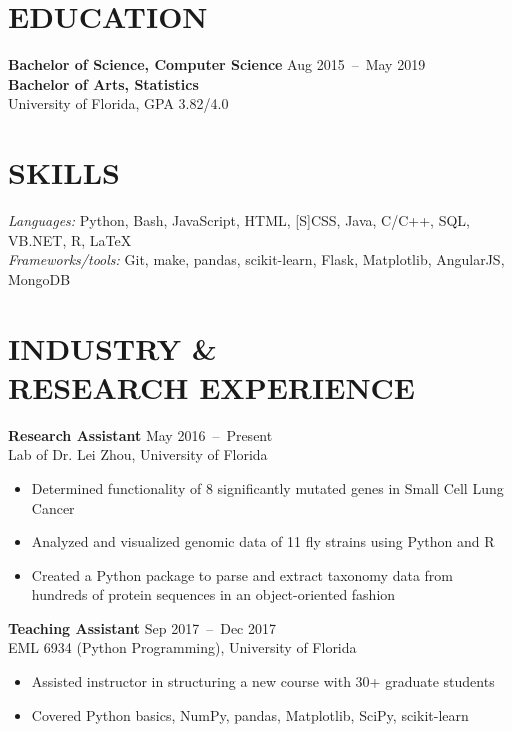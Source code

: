\documentclass[line,resmargin]{res}
\begin{document}
\address{}
\address{}

\begin{resume}

\section{EDUCATION}
    \textbf{Bachelor of Science, Computer Science}    \hfill Aug 2015~--~May 2019 \\
    \textbf{Bachelor of Arts, Statistics} \\
    University of Florida, GPA 3.82/4.0

\section{SKILLS}
    {\sl Languages:} Python, Bash, JavaScript, HTML, [S]CSS, Java, C/C++, SQL, VB.NET, R, LaTeX \\
    {\sl Frameworks/tools:} Git, make, pandas, scikit-learn, Flask, Matplotlib, AngularJS, MongoDB

\section{INDUSTRY \& \\ RESEARCH EXPERIENCE}
    \textbf{Research Assistant}    \hfill May 2016~--~Present \\
    Lab of Dr. Lei Zhou, University of Florida
    \begin{itemize}  \itemsep -2pt
        \item Determined functionality of 8 significantly mutated genes in Small Cell Lung Cancer
        \item Analyzed and visualized genomic data of 11 fly strains using Python and R
        \item Created a Python package to parse and extract taxonomy data from hundreds of protein sequences in an object-oriented fashion
    \end{itemize}

    \textbf{Teaching Assistant}    \hfill Sep 2017~--~Dec 2017 \\
    EML 6934 (Python Programming), University of Florida
    \begin{itemize}  \itemsep -2pt
        \item Assisted instructor in structuring a new course with 30+ graduate students
        \item Covered Python basics, NumPy, pandas, Matplotlib, SciPy, scikit-learn
    \end{itemize}


\end{resume}
\end{document}
